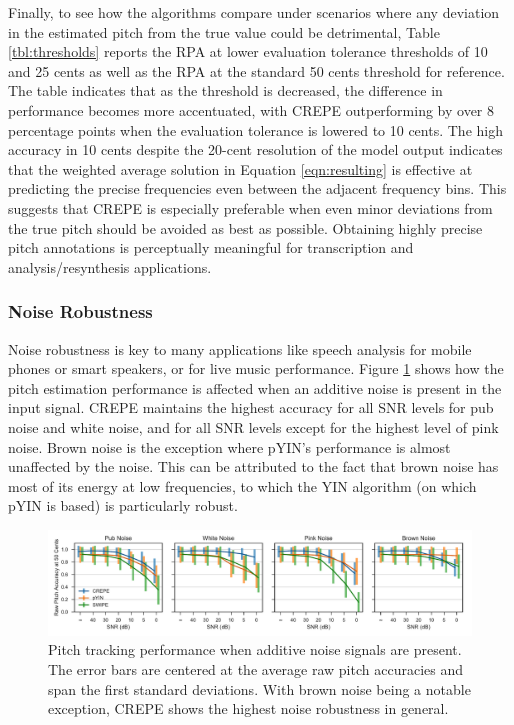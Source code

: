 Finally, to see how the algorithms compare under scenarios where any deviation in the estimated pitch from the true value could be detrimental, Table \ref{tbl:thresholds} reports the RPA at lower evaluation tolerance thresholds of 10 and 25 cents as well as the RPA at the standard 50 cents threshold for reference.
The table indicates that as the threshold is decreased, the difference in performance becomes more accentuated, with CREPE outperforming by over 8 percentage points when the evaluation tolerance is lowered to 10 cents.
The high accuracy in 10 cents despite the 20-cent resolution of the model output indicates that the weighted average solution in Equation \ref{eqn:resulting} is effective at predicting the precise frequencies even between the adjacent frequency bins.
This suggests that CREPE is especially preferable when even minor deviations from the true pitch should be avoided as best as possible.
Obtaining highly precise pitch annotations is perceptually meaningful for transcription and analysis/resynthesis applications.


\subsubsection{Noise Robustness}


Noise robustness is key to many applications like speech analysis for mobile phones or smart speakers, or for live music performance.
Figure \ref{fig:noise} shows how the pitch estimation performance is affected when an additive noise is present in the input signal.
CREPE maintains the highest accuracy for all SNR levels for pub noise and white noise, and for all SNR levels except for the highest level of pink noise.
Brown noise is the exception where pYIN's performance is almost unaffected by the noise.
This can be attributed to the fact that brown noise has most of its energy at low frequencies, to which the YIN algorithm (on which pYIN is based) is particularly robust.

\begin{figure}
	\includegraphics[width=\textwidth]{noise.pdf}
	\caption{Pitch tracking performance when additive noise signals are present. The error bars are centered at the average raw pitch accuracies and span the first standard deviations. With brown noise being a notable exception, CREPE shows the highest noise robustness in general. }
	\label{fig:noise}
\end{figure}

